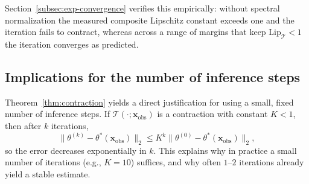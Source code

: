 Section~\ref{subsec:exp-convergence} verifies this empirically: without spectral normalization the
measured composite Lipschitz constant exceeds one and the iteration fails to contract, whereas across a
range of margins that keep $\mathrm{Lip}_\mathcal{T}<1$ the iteration converges as predicted.

\subsection{Implications for the number of inference steps}
\label{subsec:Ksteps}

Theorem~\ref{thm:contraction} yields a direct justification for using a small, fixed number of inference steps.
If $\mathcal{T}(\cdot;\mathbf{x}_\mathrm{obs})$ is a contraction with constant $K<1$, then after $k$ iterations,
$$
\lVert\theta^{(k)}-\theta^*(\mathbf{x}_\mathrm{obs})\rVert_2 \le K^k\lVert\theta^{(0)}-\theta^*(\mathbf{x}_\mathrm{obs})\rVert_2,
$$
so the error decreases exponentially in $k$.
This explains why in practice a small number of iterations (e.g., $K=10$) suffices, and why often $1$--$2$ iterations already yield a stable estimate.
